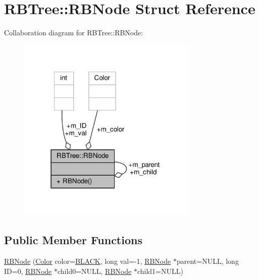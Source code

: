 \hypertarget{structRBTree_1_1RBNode}{\section{R\-B\-Tree\-:\-:R\-B\-Node Struct Reference}
\label{structRBTree_1_1RBNode}
}


Collaboration diagram for R\-B\-Tree\-:\-:R\-B\-Node\-:
\nopagebreak
\begin{figure}[H]
\begin{center}
\leavevmode
\includegraphics[width=242pt]{structRBTree_1_1RBNode__coll__graph}
\end{center}
\end{figure}
\subsection*{Public Member Functions}
\begin{DoxyCompactItemize}
\item 
\hyperlink{structRBTree_1_1RBNode_acbb7bc86831c726bc6f4a6f4ab4144f6}{R\-B\-Node} (\hyperlink{classRBTree_ad97759567366df7c32635987b1c1cf3f}{Color} color=\hyperlink{classRBTree_ad97759567366df7c32635987b1c1cf3fa4f983a00dbc34921b98ad8f47c8ed5b5}{B\-L\-A\-C\-K}, long val=-\/1, \hyperlink{structRBTree_1_1RBNode}{R\-B\-Node} $\ast$parent=N\-U\-L\-L, long I\-D=0, \hyperlink{structRBTree_1_1RBNode}{R\-B\-Node} $\ast$child0=N\-U\-L\-L, \hyperlink{structRBTree_1_1RBNode}{R\-B\-Node} $\ast$child1=N\-U\-L\-L)
\end{DoxyCompactItemize}
